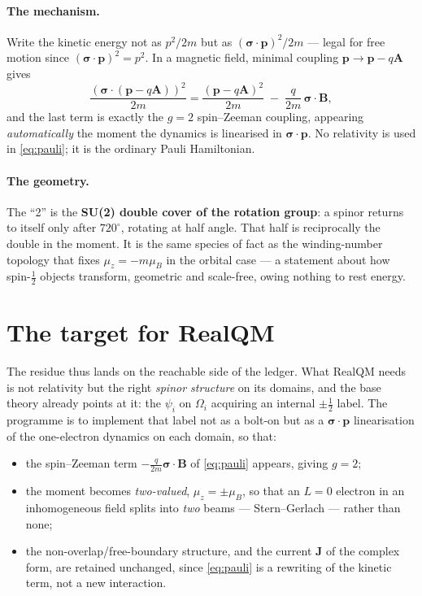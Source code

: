 \documentclass[11pt]{article}
\begin{document}
\paragraph{The mechanism.} Write the kinetic energy not as $p^2/2m$ but as
$(\boldsymbol\sigma\cdot\mathbf p)^2/2m$ --- legal for free motion since
$(\boldsymbol\sigma\cdot\mathbf p)^2 = p^2$. In a magnetic field, minimal coupling
$\mathbf p\to\mathbf p-q\mathbf A$ gives
\begin{equation}
\frac{(\boldsymbol\sigma\cdot(\mathbf p-q\mathbf A))^2}{2m}
= \frac{(\mathbf p-q\mathbf A)^2}{2m} \;-\; \frac{q}{2m}\,\boldsymbol\sigma\cdot\mathbf B ,
\label{eq:pauli}
\end{equation}
and the last term is exactly the $g=2$ spin--Zeeman coupling, appearing \emph{automatically} the moment
the dynamics is linearised in $\boldsymbol\sigma\cdot\mathbf p$. No relativity is used in
\eqref{eq:pauli}; it is the ordinary Pauli Hamiltonian.

\paragraph{The geometry.} The ``2'' is the \textbf{SU(2) double cover of the rotation group}: a spinor
returns to itself only after $720^\circ$, rotating at half angle. That half is reciprocally the double in
the moment. It is the same species of fact as the winding-number topology that fixes $\mu_z=-m\mu_B$ in
the orbital case --- a statement about how spin-$\tfrac12$ objects transform, geometric and
scale-free, owing nothing to rest energy.

\section{The target for RealQM}
\label{sec:target}

The residue thus lands on the reachable side of the ledger. What RealQM needs is not relativity but the
right \emph{spinor structure} on its domains, and the base theory already points at it: the $\psi_i$ on
$\Omega_i$ acquiring an internal $\pm\tfrac12$ label. The programme is to implement that label not as a
bolt-on but as a $\boldsymbol\sigma\cdot\mathbf p$ linearisation of the one-electron dynamics on each
domain, so that:
\begin{itemize}
\item the spin--Zeeman term $-\tfrac{q}{2m}\boldsymbol\sigma\cdot\mathbf B$ of \eqref{eq:pauli} appears,
giving $g=2$;
\item the moment becomes \emph{two-valued}, $\mu_z=\pm\mu_B$, so that an $L=0$ electron in an
inhomogeneous field splits into \emph{two} beams --- Stern--Gerlach --- rather than none;
\item the non-overlap/free-boundary structure, and the current $\mathbf J$ of the complex form, are
retained unchanged, since \eqref{eq:pauli} is a rewriting of the kinetic term, not a new interaction.
\end{itemize}
\end{document}
